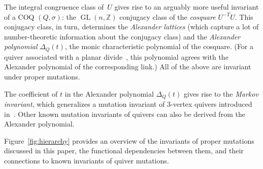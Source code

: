 \documentclass[11pt, letterpaper]{amsart}
\theoremstyle{definition}
\numberwithin{equation}{section}
\def\ZZ{{\mathbb Z}}
\def\QQ{{\mathbb Q}}
\def\CC{{\mathbb C}}
\def\GL{{\operatorname{GL}}}
\begin{document}
The integral congruence class of~$U$ %
gives rise to an arguably
more useful invariant of a COQ $(Q, \sigma)$: 
the $\GL(n,\ZZ)$ conjugacy class of the \emph{cosquare} $U^{-T} U$. 
This conjugacy class, in turn, determines the \emph{Alexander lattices}
(which capture a lot of number-theoretic information about the conjugacy class) 
and the \emph{Alexander polynomial} $\Delta_Q(t)$, 
the monic characteristic polynomial of the cosquare. 
(For a quiver associated with a planar divide~\cite{FPST}, 
this polynomial agrees with the Alexander polynomial of the corresponding link.) 
All of the above are invariant under proper mutations. 

The coefficient of $t$  in the Alexander polynomial $\Delta_Q(t)$ %
gives rise to the \emph{Markov invariant}, \linebreak[3]
which generalizes a mutation invariant of 3-vertex quivers introduced in~\cite{BBH}. 
Other known mutation invariants of quivers \cite{casals-binary, fwz1-3}  
can also be derived from the Alexander polynomial. 

\enlargethispage{5pt}

Figure~\ref{fig:hierarchy} provides an overview of the invariants of proper mutations discussed
in this paper, the functional dependencies between them, and their connections to known  
invariants of quiver mutations. 

\pagebreak[3]
\end{document}
